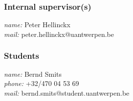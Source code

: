 \documentclass[a4paper,notitlepage]{article}
\begin{document}
\subsubsection*{Internal supervisor(s)}

{\textit{name:}} Peter Hellinckx \\
{\textit{mail:}} peter.hellinckx@uantwerpen.be

\subsubsection*{Students}

{\textit{name:}} Bernd Smits\\
{\textit{phone:}} +32/470 04 53 69\\
{\textit{mail:}} bernd.smits@student.uantwerpen.be

 {}

\end{document}
